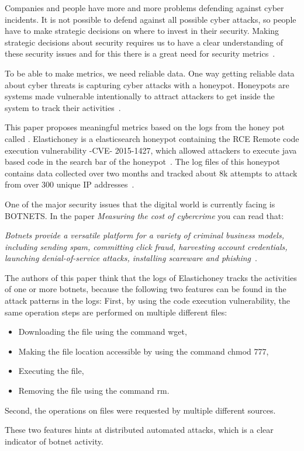 
Companies and people have more and more problems defending against cyber incidents. It is not possible to defend against all possible cyber attacks, so people have to make strategic decisions on where to invest in their security. Making strategic decisions about security requires us to have a clear understanding of these security issues and for this there is a great need for security metrics~\cite{BR2010}.

To be able to make metrics, we need reliable data. One way getting reliable data about cyber threats is capturing cyber attacks with a honeypot. Honeypots are systems made vulnerable intentionally to attract attackers to get inside the system to track their activities~\cite{WP2010}.

This paper proposes meaningful metrics based on the logs from the honey pot called . Elastichoney is a elasticsearch honeypot containing the RCE Remote code execution vulnerability -CVE- 2015-1427, which allowed attackers to execute java based code in the search bar of the honeypot~\cite{CVE}. The log files of this honeypot contains data collected over two months and tracked about 8k attempts to attack from over 300 unique IP addresses~\cite{BR2010}.

One of the major security issues that the digital world is currently facing is BOTNETS. In the paper \textit{Measuring the cost of cybercrime} you can read that:

\textit{Botnets provide a versatile platform for a variety of criminal business models, including sending spam, committing click fraud, harvesting account credentials, launching denial-of-service attacks, installing scareware and phishing}~\cite{AR2013}.

The authors of this paper think that the logs of Elastichoney tracks the activities of one or more botnets, because the following two features can be found in the attack patterns in the logs:
First, by using the code execution vulnerability, the same operation steps are performed on multiple different files:
\begin{itemize}
\item Downloading the file using the command wget,
\item Making the file location accessible by using the command chmod 777,
\item Executing the file,
\item Removing the file using the command rm.
\end{itemize}
Second, the operations on files were requested by multiple different sources.

These two features hints at distributed automated attacks, which is a clear indicator of botnet activity.

